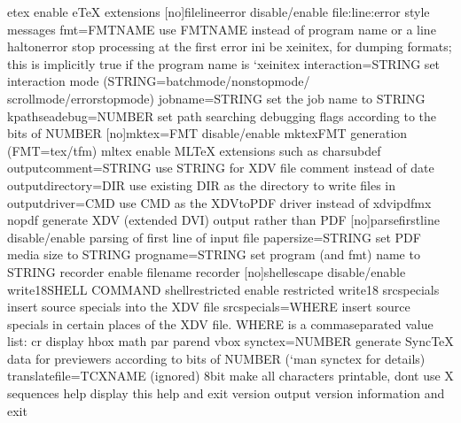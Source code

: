 \documentclass[letterpaper,12pt,english]{sphinxmanual}
\begin{document}
\begin{sphinxVerbatim}[commandchars=\\\{\}]
\PYGZhy{}etex                   enable e\PYGZhy{}TeX extensions
[\PYGZhy{}no]\PYGZhy{}file\PYGZhy{}line\PYGZhy{}error   disable/enable file:line:error style messages
\PYGZhy{}fmt=FMTNAME            use FMTNAME instead of program name or a \PYGZpc{}\PYGZam{} line
\PYGZhy{}halt\PYGZhy{}on\PYGZhy{}error          stop processing at the first error
\PYGZhy{}ini                    be xeinitex, for dumping formats; this is implicitly
                          true if the program name is {}`xeinitex\PYGZsq{}
\PYGZhy{}interaction=STRING     set interaction mode (STRING=batchmode/nonstopmode/
                          scrollmode/errorstopmode)
\PYGZhy{}jobname=STRING         set the job name to STRING
\PYGZhy{}kpathsea\PYGZhy{}debug=NUMBER  set path searching debugging flags according to
                          the bits of NUMBER
[\PYGZhy{}no]\PYGZhy{}mktex=FMT         disable/enable mktexFMT generation (FMT=tex/tfm)
\PYGZhy{}mltex                  enable MLTeX extensions such as \PYGZbs{}charsubdef
\PYGZhy{}output\PYGZhy{}comment=STRING  use STRING for XDV file comment instead of date
\PYGZhy{}output\PYGZhy{}directory=DIR   use existing DIR as the directory to write files in
\PYGZhy{}output\PYGZhy{}driver=CMD      use CMD as the XDV\PYGZhy{}to\PYGZhy{}PDF driver instead of xdvipdfmx
\PYGZhy{}no\PYGZhy{}pdf                 generate XDV (extended DVI) output rather than PDF
[\PYGZhy{}no]\PYGZhy{}parse\PYGZhy{}first\PYGZhy{}line  disable/enable parsing of first line of input file
\PYGZhy{}papersize=STRING       set PDF media size to STRING
\PYGZhy{}progname=STRING        set program (and fmt) name to STRING
\PYGZhy{}recorder               enable filename recorder
[\PYGZhy{}no]\PYGZhy{}shell\PYGZhy{}escape      disable/enable \PYGZbs{}write18\PYGZob{}SHELL COMMAND\PYGZcb{}
\PYGZhy{}shell\PYGZhy{}restricted       enable restricted \PYGZbs{}write18
\PYGZhy{}src\PYGZhy{}specials           insert source specials into the XDV file
\PYGZhy{}src\PYGZhy{}specials=WHERE     insert source specials in certain places of
                          the XDV file. WHERE is a comma\PYGZhy{}separated value
                          list: cr display hbox math par parend vbox
\PYGZhy{}synctex=NUMBER         generate SyncTeX data for previewers according to
                          bits of NUMBER ({}`man synctex\PYGZsq{} for details)
\PYGZhy{}translate\PYGZhy{}file=TCXNAME (ignored)
\PYGZhy{}8bit                   make all characters printable, don\PYGZsq{}t use \PYGZca{}\PYGZca{}X sequences
\PYGZhy{}help                   display this help and exit
\PYGZhy{}version                output version information and exit
\end{sphinxVerbatim}
\end{document}
